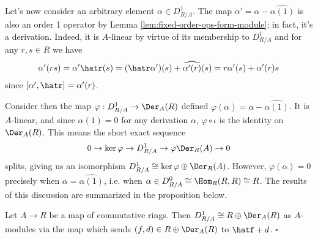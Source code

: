 Let's now consider an arbitrary element $\alpha \in D^1_{R/A}$. The map $\alpha' = \alpha - \widehat{\alpha(1)}$ is also an order 1 operator by Lemma \ref{lem:fixed-order-ops-form-module}; in fact, it's a derivation. Indeed, it is $A$-linear by virtue of its membership to $D^1_{R/A}$ and for any $r,s\in R$ we have
\begin{align*}
	\alpha'(rs) = \alpha'\hatr(s) = (\hatr \alpha')(s) + \widehat{\alpha'(r)}(s) = r\alpha'(s) + \alpha'(r)s
\end{align*}
since $[\alpha',\hatr] = \alpha'(r)$. 

Consider then the map $\varphi:D^1_{R/A}\to \Der_A(R)$ defined $\varphi(\alpha) = \alpha - \widehat{\alpha(1)}$. It is $A$-linear, and since $\alpha(1) = 0$ for any derivation $\alpha$, $\varphi\circ \iota$ is the identity on $\Der_A(R)$. This means the short exact sequence
\begin{align*}
	0 \to \ker \varphi \to D^1_{R/A} \to{\varphi} \Der_R(A) \to 0
\end{align*}
splits, giving us an isomorphism $D^1_{R/A} \cong \ker \varphi \oplus \Der_R(A)$. However, $\varphi(\alpha) = 0$ precisely when $\alpha = \widehat{\alpha(1)}$, i.e. when $\alpha \in D^0_{R/A} \cong \Hom_R(R,R) \cong R$. The results of this discussion are summarized in the proposition below.

\begin{prop}\label{prop:order-one-operators}
	Let $A\to R$ be a map of commutative rings. Then $D^1_{R/A}\cong R\oplus \Der_A(R)$ as $A$-modules via the map which sends $(f,d) \in R\oplus \Der_A(R)$ to $\hatf + d$. \hfill $\square$
\end{prop}

